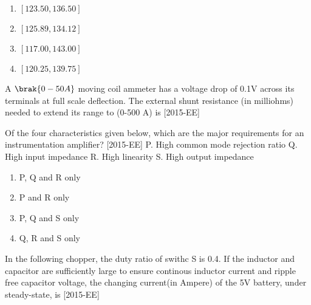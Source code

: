     \begin{enumerate}
        \item $[123.50, 136.50]$
        \item $[125.89, 134.12]$
        \item $[117.00, 143.00]$
        \item $[120.25, 139.75]$
    \end{enumerate}


    \item A $\brak{0 - 50A}$ moving coil ammeter has a voltage drop of 0.1V across its terminals at full scale deflection. The external shunt resistance (in  milliohms) needed to extend its range to (0-500 A) is \underline{\hspace{2cm}} \hfill{[2015-EE]}

    \item Of the four characteristics given below, which are the major requirements for an instrumentation amplifier? \hfill{[2015-EE]}
    P. High common mode rejection ratio
    Q. High input impedance
    R. High linearity
    S. High output impedance
    \begin{enumerate}
        \item P, Q and R only
        \item P and R only
        \item P, Q and S only
        \item Q, R and S only
    \end{enumerate}

    \item In the following chopper, the duty ratio of swithc S is 0.4. If the inductor and capacitor are sufficiently large to ensure continous inductor current and ripple free capacitor voltage, the changing current(in Ampere) of the 5V battery, under steady-state, is \underline{\hspace{2cm}} \hfill{[2015-EE]}

